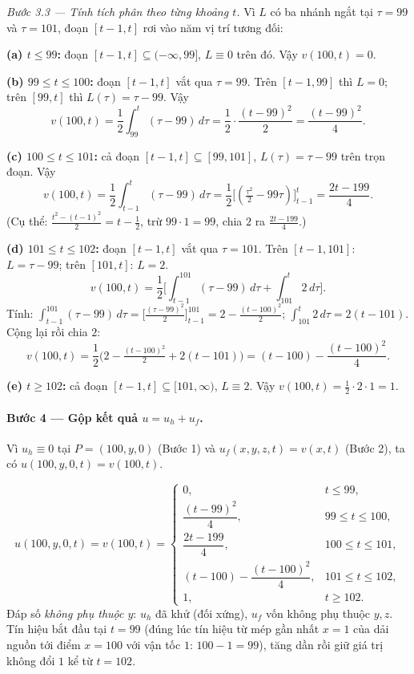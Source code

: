 \emph{Bước 3.3 --- Tính tích phân theo từng khoảng $t$.} Vì $L$ có ba nhánh ngắt tại $\tau=99$ và $\tau=101$, đoạn $[t-1,t]$ rơi vào năm vị trí tương đối:

\textbf{(a) $t\le 99$:} đoạn $[t-1,t]\subseteq(-\infty,99]$, $L\equiv 0$ trên đó. Vậy $v(100,t)=0$.

\textbf{(b) $99\le t\le 100$:} đoạn $[t-1,t]$ vắt qua $\tau=99$. Trên $[t-1,99]$ thì $L=0$; trên $[99,t]$ thì $L(\tau)=\tau-99$. Vậy
\[
  v(100,t)=\frac12\int_{99}^{t}(\tau-99)\,d\tau=\frac12\cdot\frac{(t-99)^2}{2}=\frac{(t-99)^2}{4}.
\]

\textbf{(c) $100\le t\le 101$:} cả đoạn $[t-1,t]\subseteq[99,101]$, $L(\tau)=\tau-99$ trên trọn đoạn. Vậy
\[
  v(100,t)=\frac12\int_{t-1}^{t}(\tau-99)\,d\tau=\frac12\big[(\tfrac{\tau^2}{2}-99\tau)\big]_{t-1}^{t}=\frac{2t-199}{4}.
\]
(Cụ thể: $\tfrac{t^2-(t-1)^2}{2}=t-\tfrac12$, trừ $99\cdot 1=99$, chia $2$ ra $\tfrac{2t-199}{4}$.)

\textbf{(d) $101\le t\le 102$:} đoạn $[t-1,t]$ vắt qua $\tau=101$. Trên $[t-1,101]$: $L=\tau-99$; trên $[101,t]$: $L=2$.
\[
  v(100,t)=\frac12\Big[\int_{t-1}^{101}(\tau-99)\,d\tau+\int_{101}^{t}2\,d\tau\Big].
\]
Tính: $\int_{t-1}^{101}(\tau-99)\,d\tau=\big[\tfrac{(\tau-99)^2}{2}\big]_{t-1}^{101}=2-\tfrac{(t-100)^2}{2}$; $\int_{101}^{t}2\,d\tau=2(t-101)$. Cộng lại rồi chia $2$:
\[
  v(100,t)=\frac12\Big(2-\tfrac{(t-100)^2}{2}+2(t-101)\Big)=(t-100)-\frac{(t-100)^2}{4}.
\]

\textbf{(e) $t\ge 102$:} cả đoạn $[t-1,t]\subseteq[101,\infty)$, $L\equiv 2$. Vậy $v(100,t)=\tfrac12\cdot 2\cdot 1=1$.

\paragraph{Bước 4 --- Gộp kết quả $u=u_h+u_f$.}
Vì $u_h\equiv 0$ tại $P=(100,y,0)$ (Bước 1) và $u_f(x,y,z,t)=v(x,t)$ (Bước 2), ta có $u(100,y,0,t)=v(100,t)$.
\begin{nhobox}
\[
  u(100,y,0,t)=v(100,t)=\begin{cases}
    0, & t\le 99,\\[2pt]
    \dfrac{(t-99)^2}{4}, & 99\le t\le 100,\\[6pt]
    \dfrac{2t-199}{4}, & 100\le t\le 101,\\[6pt]
    (t-100)-\dfrac{(t-100)^2}{4}, & 101\le t\le 102,\\[6pt]
    1, & t\ge 102.
  \end{cases}
\]
Đáp số \emph{không phụ thuộc $y$}: $u_h$ đã khử (đối xứng), $u_f$ vốn không phụ thuộc $y,z$. Tín hiệu bắt đầu tại $t=99$ (đúng lúc tín hiệu từ mép gần nhất $x=1$ của dải nguồn tới điểm $x=100$ với vận tốc $1$: $100-1=99$), tăng dần rồi giữ giá trị không đổi $1$ kể từ $t=102$.
\end{nhobox}

